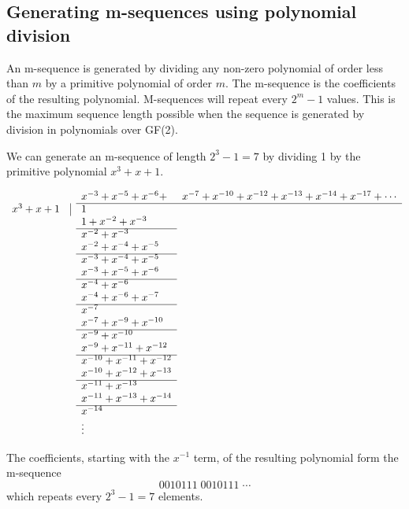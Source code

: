 \subsection{Generating m-sequences using polynomial division}
An m-sequence is generated by dividing any non-zero polynomial of order less than $m$
by a primitive polynomial of order $m$.  
The m-sequence is the coefficients of the resulting polynomial.
M-sequences will repeat every $2^m-1$ values.
This is the maximum sequence length possible when the 
sequence is generated by division in polynomials over GF(2).

\begin{example}
\label{ex:1/p(x)}
We can generate an m-sequence of length 
$2^3-1=7$ by dividing 1 by the primitive polynomial $x^3+x+1$.

\begin{fsL}
\[
\begin{array}{rrll}
           &   & x^{-3} + x^{-5} + x^{-6} +& x^{-7} + x^{-10} + x^{-12} + x^{-13} + x^{-14} + x^{-17} + \cdots \\
   \cline{3-4}
   x^3+x+1 & \vline & 1 \\
           &        & 1 + x^{-2} + x^{-3} \\
   \cline{3-3}
           &        & x^{-2} + x^{-3} \\
           &        & x^{-2} + x^{-4} + x^{-5} \\
   \cline{3-3}
           &        & x^{-3} + x^{-4} + x^{-5} \\
           &        & x^{-3} + x^{-5} + x^{-6} \\
   \cline{3-3}
           &        & x^{-4} + x^{-6}          \\
           &        & x^{-4} + x^{-6} + x^{-7} \\
   \cline{3-3}
           &        & x^{-7}                   \\
           &        & x^{-7} + x^{-9} + x^{-10} \\
   \cline{3-3}
           &        & x^{-9} + x^{-10}         \\
           &        & x^{-9} + x^{-11} + x^{-12} \\
   \cline{3-3}
           &        & x^{-10} + x^{-11} + x^{-12} \\
           &        & x^{-10} + x^{-12} + x^{-13} \\
   \cline{3-3}
           &        & x^{-11} + x^{-13}          \\
           &        & x^{-11} + x^{-13} + x^{-14} \\
   \cline{3-3}
           &        & x^{-14}           \\
           &        & \vdots           
\end{array}
\]
\end{fsL}
The coefficients, starting with the $x^{-1}$ term, 
of the resulting polynomial form the m-sequence
\[ 0010111 \; 0010111 \; \cdots \]
which repeats every $2^3-1=7$ elements.
\end{example}


